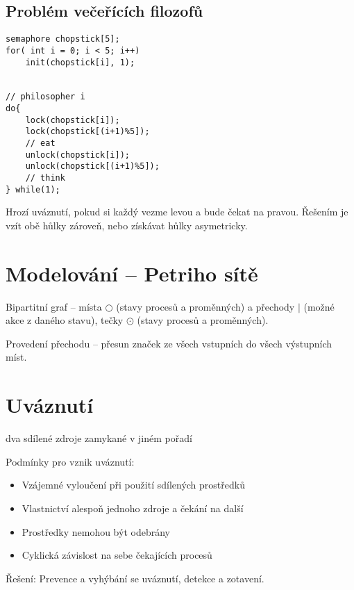 \documentclass[a4paper, 11pt]{report}
\begin{document}
\subsection{Problém večeřících filozofů}

\begin{lstlisting}
semaphore chopstick[5];
for( int i = 0; i < 5; i++)
	init(chopstick[i], 1);


// philosopher i
do{
	lock(chopstick[i]);
	lock(chopstick[(i+1)%5]);
	// eat
	unlock(chopstick[i]);
	unlock(chopstick[(i+1)%5]);
	// think
} while(1);

\end{lstlisting}

Hrozí uváznutí, pokud si každý vezme levou a bude čekat na pravou. Řešením je vzít obě hůlky zároveň, nebo získávat hůlky asymetricky.

\section{Modelování -- Petriho sítě}

Bipartitní graf -- místa $\bigcirc$ (stavy procesů a proměnných) a přechody $\mid$ (možné akce z daného stavu), tečky $\odot$ (stavy procesů a proměnných).

Provedení přechodu -- přesun značek ze všech vstupních do všech výstupních míst.

\section{Uváznutí}
dva sdílené zdroje zamykané v jiném pořadí

Podmínky pro vznik uváznutí:
\begin{itemize}
	\item Vzájemné vyloučení při použití sdílených prostředků
	\item Vlastnictví alespoň jednoho zdroje a čekání na další
	\item Prostředky nemohou být odebrány
	\item Cyklická závislost na sebe čekajících procesů
\end{itemize}

Řešení: Prevence a vyhýbání se uváznutí, detekce a zotavení.
\end{document}
